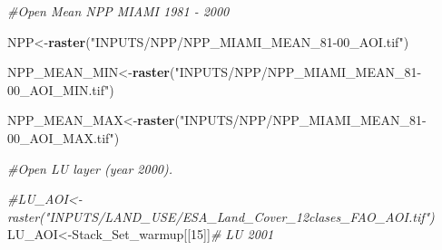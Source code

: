 \documentclass[
  10pt,
  b5paper,
]{book}
\newenvironment{Shaded}{\begin{snugshade}}{\end{snugshade}}
\newcommand{\CommentTok}[1]{\textcolor[rgb]{0.56,0.35,0.01}{\textit{#1}}}
\newcommand{\DecValTok}[1]{\textcolor[rgb]{0.00,0.00,0.81}{#1}}
\newcommand{\KeywordTok}[1]{\textcolor[rgb]{0.13,0.29,0.53}{\textbf{#1}}}
\newcommand{\NormalTok}[1]{#1}
\newcommand{\StringTok}[1]{\textcolor[rgb]{0.31,0.60,0.02}{#1}}
\begin{document}
\begin{Shaded}
\begin{Highlighting}[]
\CommentTok{#Open Mean NPP MIAMI 1981 - 2000}

\NormalTok{NPP<-}\KeywordTok{raster}\NormalTok{(}\StringTok{"INPUTS/NPP/NPP_MIAMI_MEAN_81-00_AOI.tif"}\NormalTok{)}

\NormalTok{NPP_MEAN_MIN<-}\KeywordTok{raster}\NormalTok{(}\StringTok{"INPUTS/NPP/NPP_MIAMI_MEAN_81-00_AOI_MIN.tif"}\NormalTok{)}

\NormalTok{NPP_MEAN_MAX<-}\KeywordTok{raster}\NormalTok{(}\StringTok{"INPUTS/NPP/NPP_MIAMI_MEAN_81-00_AOI_MAX.tif"}\NormalTok{)}

\CommentTok{#Open LU layer (year 2000).}

\CommentTok{#LU_AOI<-raster("INPUTS/LAND_USE/ESA_Land_Cover_12clases_FAO_AOI.tif")}
\NormalTok{LU_AOI<-Stack_Set_warmup[[}\DecValTok{15}\NormalTok{]]}\CommentTok{# LU 2001 }
  

\end{Highlighting}
\end{Shaded}
\end{document}
